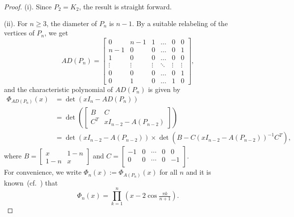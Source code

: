 \documentclass[12pt]{article}
\numberwithin{equation}{section}
\begin{document}
	\begin{proof}
		(i). Since $P_2 = K_2$, the result is straight forward.
		
		(ii). For $n\geq 3$, the diameter of $P_n$ is $n-1$. By a suitable relabeling of the vertices of $P_n$, we get
		\[AD(P_n)=
		\begin{bmatrix}
			0 & n-1 & 1 & \dots & 0 & 0 \\
			n-1 & 0 & 0 &\dots & 0 & 1 \\
			1 & 0 & 0 & \dots & 0 & 0 \\
			\vdots & \vdots &  \vdots  & \ddots & \vdots& \vdots \\
			0 & 0 & 0 & \dots & 0 & 1\\
			0 & 1 & 0 & \dots & 1 & 0 
		\end{bmatrix},
		\]		
		and the characteristic polynomial of $AD(P_n)$ is given by
		\begin{align}
			\Phi_{AD(P_n)}(x)&=\det \left(xI_n-AD(P_n)\right) \nonumber\\
			&=\det\left(
			\begin{bmatrix}
				B & C\\
				C^T & xI_{n-2}-A(P_{n-2}) 
			\end{bmatrix}\right) \nonumber\\
			&=\det(xI_{n-2}-A(P_{n-2})) \times \det\left( B - C (xI_{n-2}-A(P_{n-2}))^{-1} C^T \right),\label{e4.1}
		\end{align}	
		where $B=
		\begin{bmatrix}
			x & 1-n  \\
			1-n & x
		\end{bmatrix}$ and $C=
		\begin{bmatrix}
			-1 & 0 & \cdots & 0 & 0 \\
			0 & 0 & \cdots & 0 & -1 \\
		\end{bmatrix}.$\\
		
		For convenience, we write $\Phi_n (x) := \Phi_{A(P_{n})}(x)$ for all $n$ and it is known~(cf.~\cite[Theorem 3.7]{bapat2010graphs}) that
		\begin{equation}\label{e4.2}
			\Phi_n(x)= \overset{n}{\underset{k=1}{\prod}} \left(x-2 \cos \tfrac{\pi k}{n+1}\right).
		\end{equation}
				

\end{proof}
\end{document}
